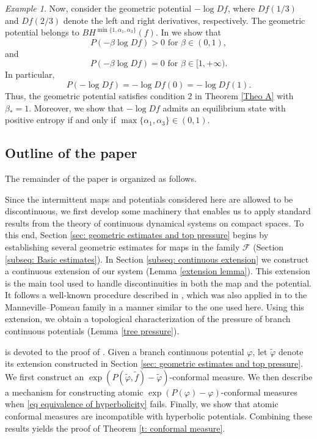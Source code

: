 \documentclass[12pt]{amsart}
\numberwithin{equation}{section} %
\numberwithin{figure}{section} %
\theoremstyle{plain}
\theoremstyle{definition}
\theoremstyle{remark}
\newtheorem{exam}[prop]{Example}
\theoremstyle{citing}
\newcommand{\sF}{\mathscr{F}}
\renewcommand{\=}{\coloneqq}
\begin{document}
\begin{exam}
    Now, consider the geometric potential $-\log Df$, where $Df(1/3)$ and $Df(2/3)$ denote the left and right derivatives, respectively. The geometric potential belongs to $BH^{\min\{1,\alpha_1,\alpha_3\}}(f)$. In  \cite{CoronelMonardes} we show that
    \begin{equation*}
         P(-\beta\log Df) > 0 \text{ for }\beta\in(0,1),
    \end{equation*}
    and
    \begin{equation*}
         P(-\beta\log Df) =0 \text{ for }\beta\in [1,+\infty). 
    \end{equation*}
    In particular,
    \begin{equation*}
        P(-\log Df) = -\log Df(0) = -\log Df(1).
    \end{equation*}
    Thus, the geometric potential satisfies condition 2 in Theorem \ref{Theo A} with $\beta_* = 1$.
    Moreover, we show that $-\log Df$ admits an equilibrium state with positive entropy if and only if $\max\{\alpha_1,\alpha_3\} \in (0,1)$.
\end{exam}

\subsection{Outline of the paper}

The remainder of the paper is organized as follows.

Since the intermittent maps and potentials considered here are allowed to be discontinuous, we first develop some machinery that enables us to apply standard results from the theory of continuous dynamical systems on compact spaces. To this end, Section \ref{sec: geometric estimates and top pressure} begins by establishing several geometric estimates for maps in the family $\sF$ (Section \ref{subseq: Basic estimates}). In Section \ref{subseq: continuous extension} we construct a continuous extension of our system (Lemma \ref{extension lemma}). This extension is the main tool used to handle discontinuities in both the map and the potential. It follows a well-known procedure described in \cite[Appendix A.5]{Keller2}, which was also applied in \cite{coronelRivera1} to the Manneville--Pomeau family in a manner similar to the one used here. Using this extension, we obtain a topological characterization of the pressure of branch continuous potentials (Lemma \ref{tree pressure}).

 is devoted to the proof of . Given a branch continuous potential $\varphi$, let $\widetilde{\varphi}$ denote its extension constructed in Section \ref{sec: geometric estimates and top pressure}. We first construct an $\exp(P(\widetilde{\varphi},\widetilde{f})-\widetilde{\varphi})$-conformal measure. We then describe a mechanism for constructing atomic $\exp(P(\varphi)-\varphi)$-conformal measures when \eqref{eq equivalence of hyperbolicity} fails. Finally, we show that atomic conformal measures are incompatible with hyperbolic potentials. Combining these results yields the proof of Theorem \ref{t: conformal measure}.
\end{document}
